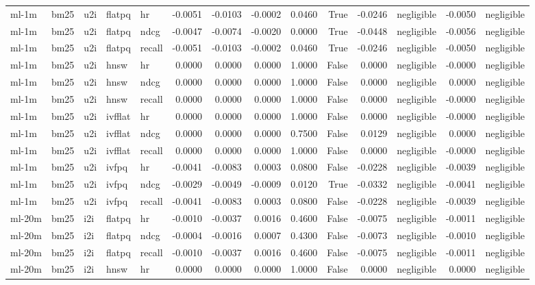 \begin{tabular}{lllllrrrrrrlrl}
ml-1m & bm25 & u2i & flatpq & hr & -0.0051 & -0.0103 & -0.0002 & 0.0460 & True & -0.0246 & negligible & -0.0050 & negligible \\
ml-1m & bm25 & u2i & flatpq & ndcg & -0.0047 & -0.0074 & -0.0020 & 0.0000 & True & -0.0448 & negligible & -0.0056 & negligible \\
ml-1m & bm25 & u2i & flatpq & recall & -0.0051 & -0.0103 & -0.0002 & 0.0460 & True & -0.0246 & negligible & -0.0050 & negligible \\
ml-1m & bm25 & u2i & hnsw & hr & 0.0000 & 0.0000 & 0.0000 & 1.0000 & False & 0.0000 & negligible & -0.0000 & negligible \\
ml-1m & bm25 & u2i & hnsw & ndcg & 0.0000 & 0.0000 & 0.0000 & 1.0000 & False & 0.0000 & negligible & 0.0000 & negligible \\
ml-1m & bm25 & u2i & hnsw & recall & 0.0000 & 0.0000 & 0.0000 & 1.0000 & False & 0.0000 & negligible & -0.0000 & negligible \\
ml-1m & bm25 & u2i & ivfflat & hr & 0.0000 & 0.0000 & 0.0000 & 1.0000 & False & 0.0000 & negligible & -0.0000 & negligible \\
ml-1m & bm25 & u2i & ivfflat & ndcg & 0.0000 & 0.0000 & 0.0000 & 0.7500 & False & 0.0129 & negligible & 0.0000 & negligible \\
ml-1m & bm25 & u2i & ivfflat & recall & 0.0000 & 0.0000 & 0.0000 & 1.0000 & False & 0.0000 & negligible & -0.0000 & negligible \\
ml-1m & bm25 & u2i & ivfpq & hr & -0.0041 & -0.0083 & 0.0003 & 0.0800 & False & -0.0228 & negligible & -0.0039 & negligible \\
ml-1m & bm25 & u2i & ivfpq & ndcg & -0.0029 & -0.0049 & -0.0009 & 0.0120 & True & -0.0332 & negligible & -0.0041 & negligible \\
ml-1m & bm25 & u2i & ivfpq & recall & -0.0041 & -0.0083 & 0.0003 & 0.0800 & False & -0.0228 & negligible & -0.0039 & negligible \\
ml-20m & bm25 & i2i & flatpq & hr & -0.0010 & -0.0037 & 0.0016 & 0.4600 & False & -0.0075 & negligible & -0.0011 & negligible \\
ml-20m & bm25 & i2i & flatpq & ndcg & -0.0004 & -0.0016 & 0.0007 & 0.4300 & False & -0.0073 & negligible & -0.0010 & negligible \\
ml-20m & bm25 & i2i & flatpq & recall & -0.0010 & -0.0037 & 0.0016 & 0.4600 & False & -0.0075 & negligible & -0.0011 & negligible \\
ml-20m & bm25 & i2i & hnsw & hr & 0.0000 & 0.0000 & 0.0000 & 1.0000 & False & 0.0000 & negligible & 0.0000 & negligible \\

\end{tabular}
